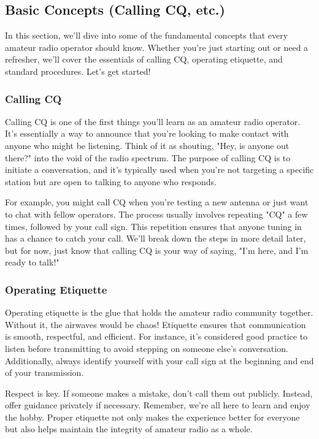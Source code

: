 \subsection{Basic Concepts (Calling CQ, etc.)}
\label{subsec:basics-calling}

In this section, we'll dive into some of the fundamental concepts that every amateur radio operator should know. Whether you're just starting out or need a refresher, we'll cover the essentials of calling CQ, operating etiquette, and standard procedures. Let's get started!

\subsubsection*{Calling CQ}
Calling CQ is one of the first things you'll learn as an amateur radio operator. It's essentially a way to announce that you're looking to make contact with anyone who might be listening. Think of it as shouting, "Hey, is anyone out there?" into the void of the radio spectrum. The purpose of calling CQ is to initiate a conversation, and it's typically used when you're not targeting a specific station but are open to talking to anyone who responds.

For example, you might call CQ when you're testing a new antenna or just want to chat with fellow operators. The process usually involves repeating "CQ" a few times, followed by your call sign. This repetition ensures that anyone tuning in has a chance to catch your call. We'll break down the steps in more detail later, but for now, just know that calling CQ is your way of saying, "I'm here, and I'm ready to talk!"

\subsubsection*{Operating Etiquette}
Operating etiquette is the glue that holds the amateur radio community together. Without it, the airwaves would be chaos! Etiquette ensures that communication is smooth, respectful, and efficient. For instance, it's considered good practice to listen before transmitting to avoid stepping on someone else's conversation. Additionally, always identify yourself with your call sign at the beginning and end of your transmission.

Respect is key. If someone makes a mistake, don't call them out publicly. Instead, offer guidance privately if necessary. Remember, we're all here to learn and enjoy the hobby. Proper etiquette not only makes the experience better for everyone but also helps maintain the integrity of amateur radio as a whole.

